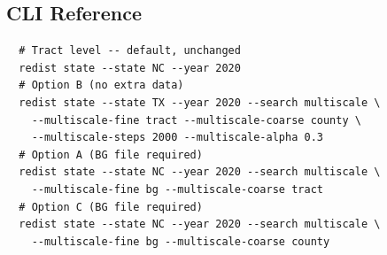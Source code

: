 \subsection{CLI Reference}

\begin{verbatim}
  # Tract level -- default, unchanged
  redist state --state NC --year 2020
  # Option B (no extra data)
  redist state --state TX --year 2020 --search multiscale \
    --multiscale-fine tract --multiscale-coarse county \
    --multiscale-steps 2000 --multiscale-alpha 0.3
  # Option A (BG file required)
  redist state --state NC --year 2020 --search multiscale \
    --multiscale-fine bg --multiscale-coarse tract
  # Option C (BG file required)
  redist state --state NC --year 2020 --search multiscale \
    --multiscale-fine bg --multiscale-coarse county
\end{verbatim}
